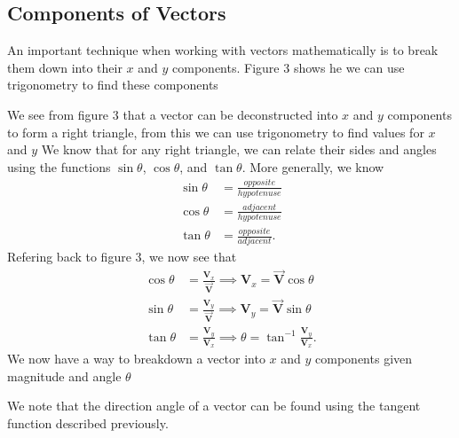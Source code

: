\documentclass{report}
\begin{document}
    \subsection{Components of Vectors}
    \bigbreak \noindent 
    An important technique when working with vectors mathematically is to break them down into their \(x\) and \(y\) components. Figure 3 shows he we can use trigonometry to find these components
    \bigbreak \noindent 
    \begin{figure}[ht]
        \centering
        \label{fig:figure3}
    \end{figure}
    \bigbreak \noindent 
    \bigbreak \noindent 
    We see from figure 3 that a vector can be deconstructed into $x$ and $y$ components to form a right triangle, from this we can use trigonometry to find values for $x$ and $y$
    \bigbreak \noindent 
    We know that for any right triangle, we can relate their sides and angles using the functions $\sin{\theta}$, $\cos{\theta}$, and $\tan{\theta}$. More generally, we know
    \begin{align*}
        \sin{\theta} &= \frac{opposite}{hypotenuse} \\
        \cos{\theta} &= \frac{adjacent}{hypotenuse} \\
        \tan{\theta} &= \frac{opposite}{adjacent}
    .\end{align*}
    \bigbreak \noindent 
    Refering back to figure 3, we now see that 
    \begin{align*}
        \cos{\theta} &= \frac{\mathbf{V}_{x}}{\vec{\mathbf{V}}} \implies \mathbf{V}_{x} = \vec{\mathbf{V}}\cos{\theta} \\
        \sin{\theta} &= \frac{\mathbf{V}_{y}}{\vec{\mathbf{V}}} \implies \mathbf{V}_{y} = \vec{\mathbf{V}}\sin{\theta} \\
        \tan{\theta} &= \frac{\mathbf{V}_{y}}{\mathbf{V}_{x}} \implies \theta = \tan^{-1}{\frac{\mathbf{V}_{y}}{\mathbf{V}_{x}}}
    .\end{align*}
    \bigbreak \noindent 
    We now have a way to breakdown a vector into $x$ and $y$ components given magnitude and angle $\theta$
    \bigbreak \noindent 
    \begin{remark}
        We note that the direction angle of a vector can be found using the tangent function described previously.
    \end{remark}
    

    \bigbreak \noindent 
\end{document}
